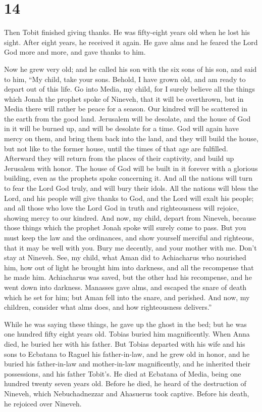 \hypertarget{section-13}{%
\section{14}\label{section-13}}

 Then Tobit finished giving thanks.  He was
fifty-eight years old when he lost his sight. After eight years, he
received it again. He gave alms and he feared the Lord God more and
more, and gave thanks to him.

 Now he grew very old; and he called his son with the six
sons of his son, and said to him, ``My child, take your sons. Behold, I
have grown old, and am ready to depart out of this life.  Go
into Media, my child, for I surely believe all the things which Jonah
the prophet spoke of Nineveh, that it will be overthrown, but in Media
there will rather be peace for a season. Our kindred will be scattered
in the earth from the good land. Jerusalem will be desolate, and the
house of God in it will be burned up, and will be desolate for a time.
 God will again have mercy on them, and bring them back into
the land, and they will build the house, but not like to the former
house, until the times of that age are fulfilled. Afterward they will
return from the places of their captivity, and build up Jerusalem with
honor. The house of God will be built in it forever with a glorious
building, even as the prophets spoke concerning it.  And all
the nations will turn to fear the Lord God truly, and will bury their
idols.  All the nations will bless the Lord, and his people
will give thanks to God, and the Lord will exalt his people; and all
those who love the Lord God in truth and righteousness will rejoice,
showing mercy to our kindred.  And now, my child, depart
from Nineveh, because those things which the prophet Jonah spoke will
surely come to pass.  But you must keep the law and the
ordinances, and show yourself merciful and righteous, that it may be
well with you.  Bury me decently, and your mother with me.
Don't stay at Nineveh. See, my child, what Aman did to Achiacharus who
nourished him, how out of light he brought him into darkness, and all
the recompense that he made him. Achiacharus was saved, but the other
had his recompense, and he went down into darkness. Manasses gave alms,
and escaped the snare of death which he set for him; but Aman fell into
the snare, and perished.  And now, my children, consider
what alms does, and how righteousness delivers.''

While he was saying these things, he gave up the ghost in the bed; but
he was one hundred fifty eight years old. Tobias buried him
magnificently.  When Anna died, he buried her with his
father. But Tobias departed with his wife and his sons to Ecbatana to
Raguel his father-in-law,  and he grew old in honor, and he
buried his father-in-law and mother-in-law magnificently, and he
inherited their possessions, and his father Tobit's.  He
died at Ecbatana of Media, being one hundred twenty seven years old.
 Before he died, he heard of the destruction of Nineveh,
which Nebuchadnezzar and Ahasuerus took captive. Before his death, he
rejoiced over Nineveh.
